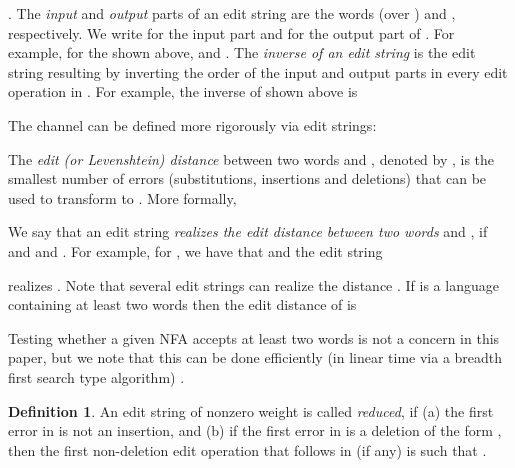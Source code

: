 \documentclass{article}
\theoremstyle{plain}
\theoremstyle{definition}
\newtheorem{definition}[theorem]{Definition}
\theoremstyle{remark}
\newcommand\pssn{\par\smallskip\noindent}
\begin{document}
.
The \emph{input} and \emph{output} parts of an edit
string  are the words (over )
 and , respectively. We write
 for the input part and  for the output part of
. For example, for the  shown above,
 and .
The \emph{inverse of an edit string}  is the edit string
resulting by inverting the order of the input and output
parts in every edit operation in . For example, the inverse
of  shown above is

The channel  can be defined more rigorously via edit
strings:

\pssn
The \emph{edit (or Levenshtein) distance} \cite{Levenshtein:66:en} between two words  and
, denoted by , is the smallest number of errors
(substitutions, insertions and deletions) that can be used to
transform  to . More formally,

We say that an edit string  \emph{realizes the edit distance
between two words}  and , if  and
 and .
For example, for , we have that
 and the edit string

realizes .
Note that several edit strings can realize the distance .
If  is a language containing at least two words then the edit
distance of  is

Testing whether a given NFA accepts at least two words is
not a concern in this paper, but we note that this can
be done efficiently (in linear time via a breadth
first search type algorithm) \cite{Yang:2012}.

\begin{definition}
An edit string  of nonzero weight is called \emph{reduced}, if
(a) the first error in  is not an insertion, and
(b) if the first error in  is a deletion of the form , then the first non-deletion edit operation  that follows  in  (if any) is such that .
\end{definition}
\end{document}
